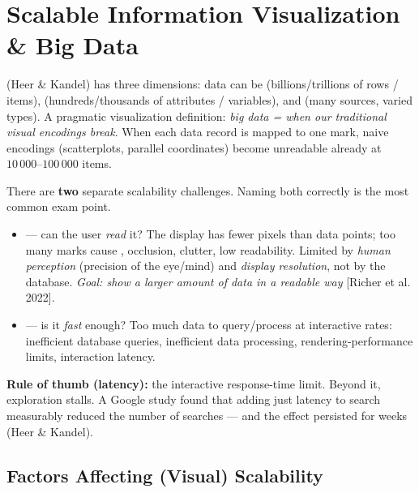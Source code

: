 \section{Scalable Information Visualization \& Big Data}

 (Heer \& Kandel) has three dimensions: data can be 
(billions/trillions of rows / items),  (hundreds/thousands of
attributes / variables), and  (many sources, varied types). A
pragmatic visualization definition: \emph{big data = when our traditional
visual encodings break}. When each data record is mapped to one mark, naive
encodings (scatterplots, parallel coordinates) become unreadable already at
$10\,000$--$100\,000$ items.

\begin{keybox}
There are \textbf{two} separate scalability challenges. Naming both correctly
is the most common exam point.
\begin{itemize}
  \item {} --- can the user \emph{read} it?
        The display has fewer pixels than data points; too many marks cause
        , occlusion, clutter, low readability. Limited by
        \emph{human perception} (precision of the eye/mind) and \emph{display
        resolution}, not by the database. \emph{Goal: show a larger amount of
        data in a readable way} [Richer et al. 2022].
  \item {} --- is it \emph{fast}
        enough? Too much data to query/process at interactive rates:
        inefficient database queries, inefficient data processing,
        rendering-performance limits, interaction latency.
\end{itemize}
\textbf{Rule of thumb (latency):} the  interactive response-time
limit. Beyond it, exploration stalls. A Google study found that adding just
 latency to search measurably reduced the number of searches ---
and the effect persisted for weeks (Heer \& Kandel).
\end{keybox}

\subsection{Factors Affecting (Visual) Scalability}

